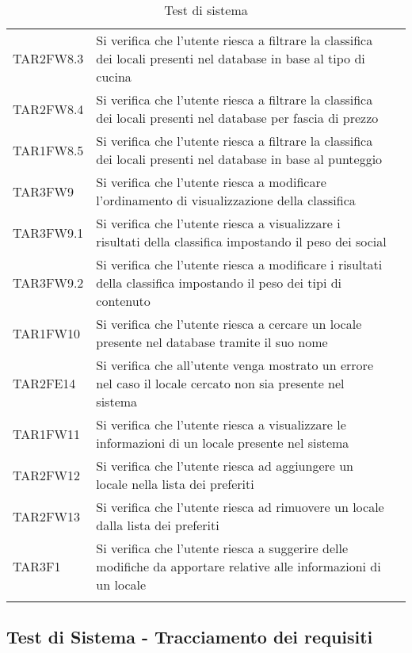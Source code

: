 \begin{longtable}{ m{}<{\centering}  m{}<{\centering}  m{}<{\centering} }
	TAR2FW8.3 & Si verifica che l'utente riesca a filtrare la classifica dei locali presenti nel database in base al tipo di cucina & \Ni \\
	TAR2FW8.4 & Si verifica che l'utente riesca a filtrare la classifica dei locali presenti nel database per fascia di prezzo & \Ni \\
	TAR1FW8.5 & Si verifica che l'utente riesca a filtrare la classifica dei locali presenti nel database in base al punteggio & \Ni \\
	TAR3FW9 & Si verifica che l'utente riesca a modificare l'ordinamento di visualizzazione della classifica & \Ni \\
	TAR3FW9.1 & Si verifica che l'utente riesca a visualizzare i risultati della classifica impostando il peso dei social & \Ni \\
	TAR3FW9.2 & Si verifica che l'utente riesca a modificare i risultati della classifica impostando il peso dei tipi di contenuto & \Ni \\
	TAR1FW10 & Si verifica che l'utente riesca a cercare un locale presente nel database tramite il suo nome & \Ni \\
	TAR2FE14 & Si verifica che all'utente venga mostrato un errore nel caso il locale cercato non sia presente nel sistema & \Ni \\
	TAR1FW11 & Si verifica che l'utente riesca a visualizzare le informazioni di un locale presente nel sistema & \Ni \\
	TAR2FW12 & Si verifica che l'utente riesca ad aggiungere un locale nella lista dei preferiti & \Ni \\
	TAR2FW13 & Si verifica che l'utente riesca ad rimuovere un locale dalla lista dei preferiti & \Ni \\
	TAR3F1 & Si verifica che l'utente riesca a suggerire delle modifiche da apportare relative alle informazioni di un locale & \Ni \\
	
    \caption{Test di sistema}
\end{longtable}	

\subsection{Test di Sistema - Tracciamento dei requisiti}


